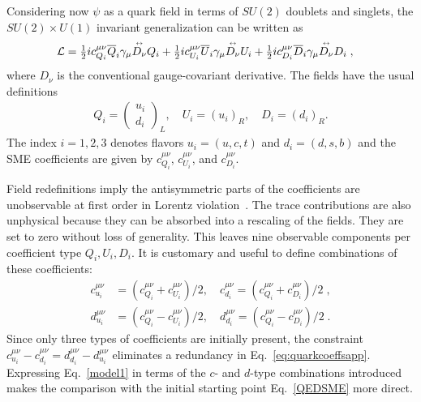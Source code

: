 %

Considering now $\psi$ as a quark field
in terms of $SU(2)$ doublets
and singlets, 
the $SU(2)\times U(1)$ invariant generalization
can be written as
%
\begin{align}
\label{model1}
\mathcal{L} &= \tfrac{1}{2}i c_{Q_i}^{\mu\nu}\overline{Q}_i\gamma_\mu\overset{\text{\tiny$\leftrightarrow$}}{D_{\nu}}Q_i  + \tfrac{1}{2}i c_{U_i}^{\mu\nu}\overline{U}_i\gamma_\mu\overset{\text{\tiny$\leftrightarrow$}}{D_{\nu}}U_i 
 + \tfrac{1}{2}i c_{D_i}^{\mu\nu}\overline{D}_i\gamma_\mu\overset{\text{\tiny$\leftrightarrow$}}{D_{\nu}}D_i \;,
\end{align}
%
where $D_\nu$ is the conventional 
gauge-covariant derivative. 
The fields have the usual definitions
%
\begin{align}
Q_i = \begin{pmatrix} u_i \\ d_i \end{pmatrix}_L, \quad U_i = \left(u_i\right)_R, \quad D_i = \left(d_i\right)_R.
\end{align}
%
The index $i = 1, 2, 3$ denotes flavors $u_i = (u, c, t)$ and 
$d_i = (d, s, b)$ and the SME coefficients are given 
by $c_{Q_i}^{\mu\nu}$, $c_{U_i}^{\mu\nu}$, and $c_{D_i}^{\mu\nu}$. 

Field redefinitions imply the antisymmetric parts of the coefficients 
are unobservable at first order in Lorentz 
violation~\cite{Colladay:1998fq, Fittante:2012ua, Colladay:2002eh}. 
The trace contributions are also unphysical because they can be 
absorbed into a rescaling of the fields. 
They are set to zero without loss of generality. 
This leaves nine observable components per coefficient type
$Q_i, U_i, D_i$. 
It is customary and useful to define 
combinations of these coefficients:
%
\begin{align}
\label{eq:quarkcoeffsapp}
c_{u_i}^{\mu\nu} &= (c_{Q_i}^{\mu\nu} + c_{U_i}^{\mu\nu})/2, \quad c_{d_i}^{\mu\nu} = (c_{Q_i}^{\mu\nu} + c_{D_i}^{\mu\nu})/2  \;, \nonumber\\
d_{u_i}^{\mu\nu} &= (c_{Q_i}^{\mu\nu} - c_{U_i}^{\mu\nu})/2, \quad d_{d_i}^{\mu\nu} = (c_{Q_i}^{\mu\nu} - c_{D_i}^{\mu\nu})/2  \;.
\end{align}
%
Since only three types of coefficients are initially present, 
the constraint 
$c_{u_i}^{\mu\nu} -c_{d_i}^{\mu\nu} 
= d_{d_i}^{\mu\nu} - d_{u_i}^{\mu\nu}$ eliminates
a redundancy in Eq.~\eqref{eq:quarkcoeffsapp}. 
Expressing Eq.~\eqref{model1} in terms of the $c$- and
$d$-type combinations introduced makes the comparison 
with the initial starting point Eq.~\eqref{QEDSME} more direct. 
%
